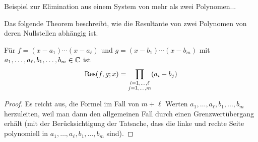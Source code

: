 \documentclass[11pt]{article}
\numberwithin{equation}{section}
\begin{document}
\begin{beispiel}
	Beispiel zur Elimination aus einem System von mehr als zwei Polynomen...
\end{beispiel} 

Das folgende Theorem beschreibt, wie die Resultante von zwei Polynomen von deren Nullstellen abhängig ist. 

\begin{theorem}
	\label{thm:res:mit:nullstellen} 
	Für $f = (x - a_1) \cdots (x - a_\ell)$ und $g = (x -b_1) \cdots (x-b_m)$  mit $a_1,\ldots, a_\ell, b_1,\ldots, b_m \in \mathbb{C}$ ist 
	\[
		\operatorname{Res}(f,g;x) = \prod_{\substack{i=1,\ldots,\ell \\ j=1,\ldots,m} } (a_i- b_j)
	\]
\end{theorem} 
\begin{proof} 
		Es reicht aus, die Formel im Fall von $m+\ell$ Werten $a_1,\ldots, a_\ell, b_1,\ldots,b_m$ herzuleiten, weil man dann den allgemeinen Fall durch einen Grenzwertübergang erhält (mit der Berücksichtigung der Tatsache, dass die linke und rechte Seite polynomiell in $a_1,\ldots,a_\ell,b_1,\ldots,b_m$ sind). 
		

\end{proof}
\end{document}
